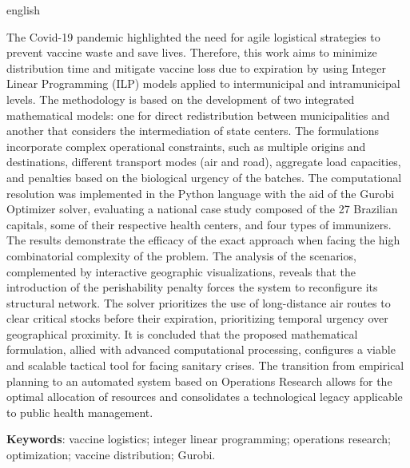 \begin{resumo}[Abstract]
\begin{otherlanguage*}{english}
\begin{SingleSpace}
The Covid-19 pandemic highlighted the need for agile logistical strategies to prevent vaccine waste and save lives. Therefore, this work aims to minimize distribution time and mitigate vaccine loss due to expiration by using Integer Linear Programming (ILP) models applied to intermunicipal and intramunicipal levels. The methodology is based on the development of two integrated mathematical models: one for direct redistribution between municipalities and another that considers the intermediation of state centers. The formulations incorporate complex operational constraints, such as multiple origins and destinations, different transport modes (air and road), aggregate load capacities, and penalties based on the biological urgency of the batches. The computational resolution was implemented in the Python language with the aid of the Gurobi Optimizer solver, evaluating a national case study composed of the 27 Brazilian capitals, some of their respective health centers, and four types of immunizers. The results demonstrate the efficacy of the exact approach when facing the high combinatorial complexity of the problem. The analysis of the scenarios, complemented by interactive geographic visualizations, reveals that the introduction of the perishability penalty forces the system to reconfigure its structural network. The solver prioritizes the use of long-distance air routes to clear critical stocks before their expiration, prioritizing temporal urgency over geographical proximity. It is concluded that the proposed mathematical formulation, allied with advanced computational processing, configures a viable and scalable tactical tool for facing sanitary crises. The transition from empirical planning to an automated system based on Operations Research allows for the optimal allocation of resources and consolidates a technological legacy applicable to public health management.
\end{SingleSpace}

\vspace{\onelineskip}
   \textbf{Keywords}: vaccine logistics; integer linear programming; operations research; optimization; vaccine distribution; Gurobi.
 \end{otherlanguage*}
\end{resumo}